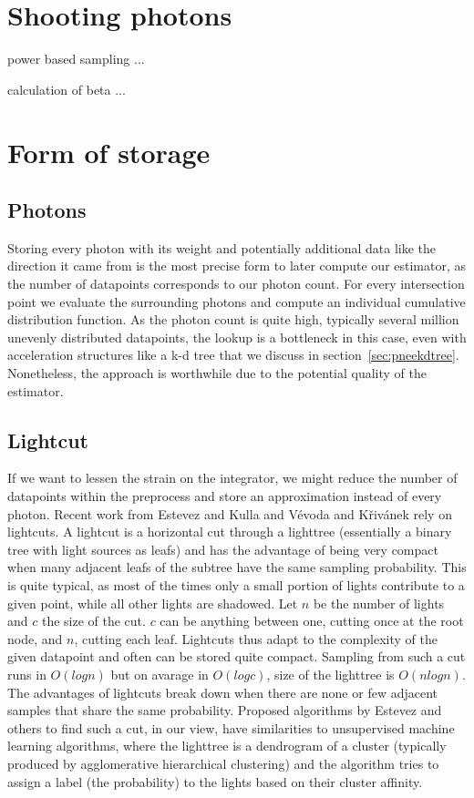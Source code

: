 
\section{Shooting photons}

power based sampling ...

calculation of beta ...


\section{Form of storage}

\subsection{Photons}

Storing every photon with its weight and potentially additional data like the direction it came from is the most precise form to later compute our estimator, as the number of datapoints corresponds to our photon count. For every intersection point we evaluate the surrounding photons and compute an individual cumulative distribution function. As the photon count is quite high, typically several million unevenly distributed datapoints, the lookup is a bottleneck in this case, even with acceleration structures like a k-d tree that we discuss in section~\ref{sec:pneekdtree}. Nonetheless, the approach is worthwhile due to the potential quality of the estimator.

\subsection{Lightcut}

If we want to lessen the strain on the integrator, we might reduce the number of datapoints within the preprocess and store an approximation instead of every photon. Recent work from Estevez and Kulla \cite{Estevez} and Vévoda and Křivánek \cite{Vevoda} rely on lightcuts. A lightcut is a horizontal cut through a lighttree (essentially a binary tree with light sources as leafs) and has the advantage of being very compact when many adjacent leafs of the subtree have the same sampling probability. This is quite typical, as most of the times only a small portion of lights contribute to a given point, while all other lights are shadowed. Let $n$ be the number of lights and $c$ the size of the cut. $c$ can be anything between one, cutting once at the root node, and $n$, cutting each leaf. Lightcuts thus adapt to the complexity of the given datapoint and often can be stored quite compact. Sampling from such a cut runs in $O(log n)$ but on avarage in $O(log c)$, size of the lighttree is $O(nlogn)$. The advantages of lightcuts break down when there are none or few adjacent samples that share the same probability. Proposed algorithms by Estevez \cite{Estevez} and others to find such a cut, in our view, have similarities to unsupervised machine learning algorithms, where the lighttree is a dendrogram of a cluster (typically produced by agglomerative hierarchical clustering) and the algorithm tries to assign a label (the probability) to the lights based on their cluster affinity. 

